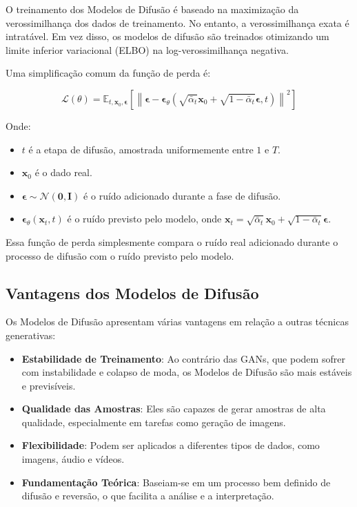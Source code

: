 \documentclass[a4paper]{tufte-handout}
\begin{document}
O treinamento dos Modelos de Difusão é baseado na maximização da verossimilhança dos dados de treinamento. No entanto, a verossimilhança exata é intratável. Em vez disso, os modelos de difusão são treinados otimizando um limite inferior variacional (ELBO) na log-verossimilhança negativa.

Uma simplificação comum da função de perda é:

\begin{equation*}
    \mathcal{L}(\theta) = \mathbb{E}_{t, \mathbf{x}_0, \boldsymbol{\epsilon}} \left[ \left\| \boldsymbol{\epsilon} - \boldsymbol{\epsilon}_\theta(\sqrt{\bar{\alpha}_t} \mathbf{x}_0 + \sqrt{1 - \bar{\alpha}_t} \boldsymbol{\epsilon}, t) \right\|^2 \right]
\end{equation*}

Onde:
\begin{itemize}
    \item $t$ é a etapa de difusão, amostrada uniformemente entre $1$ e $T$.
    \item $\mathbf{x}_0$ é o dado real.
    \item $\boldsymbol{\epsilon} \sim \mathcal{N}(\mathbf{0}, \mathbf{I})$ é o ruído adicionado durante a fase de difusão.
    \item $\boldsymbol{\epsilon}_\theta(\mathbf{x}_t, t)$ é o ruído previsto pelo modelo, onde $\mathbf{x}_t = \sqrt{\bar{\alpha}_t} \mathbf{x}_0 + \sqrt{1 - \bar{\alpha}_t} \boldsymbol{\epsilon}$.
\end{itemize}

Essa função de perda simplesmente compara o ruído real adicionado durante o processo de difusão com o ruído previsto pelo modelo.

\subsection{Vantagens dos Modelos de Difusão}

Os Modelos de Difusão apresentam várias vantagens em relação a outras técnicas generativas:
\begin{itemize}
    \item \textbf{Estabilidade de Treinamento}: Ao contrário das GANs, que podem sofrer com instabilidade e colapso de moda, os Modelos de Difusão são mais estáveis e previsíveis.
    \item \textbf{Qualidade das Amostras}: Eles são capazes de gerar amostras de alta qualidade, especialmente em tarefas como geração de imagens.
    \item \textbf{Flexibilidade}: Podem ser aplicados a diferentes tipos de dados, como imagens, áudio e vídeos.
    \item \textbf{Fundamentação Teórica}: Baseiam-se em um processo bem definido de difusão e reversão, o que facilita a análise e a interpretação.
\end{itemize}
\end{document}
